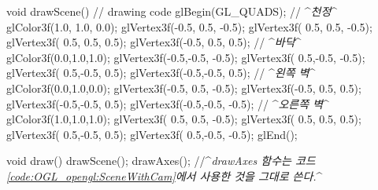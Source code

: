 void drawScene() {
  // drawing code
  glBegin(GL_QUADS);
  // ^{\it 천정}^
  glColor3f(1.0, 1.0, 0.0);
  glVertex3f(-0.5, 0.5, -0.5);
  glVertex3f( 0.5, 0.5, -0.5);
  glVertex3f( 0.5, 0.5,  0.5);
  glVertex3f(-0.5, 0.5,  0.5);
  // ^{\it 바닥}^
  glColor3f(0.0,1.0,1.0);
  glVertex3f(-0.5,-0.5, -0.5);
  glVertex3f( 0.5,-0.5, -0.5);
  glVertex3f( 0.5,-0.5,  0.5);
  glVertex3f(-0.5,-0.5,  0.5);
  // ^{\it 왼쪽 벽}^
  glColor3f(0.0,1.0,0.0);
  glVertex3f(-0.5, 0.5, -0.5);
  glVertex3f(-0.5, 0.5,  0.5);
  glVertex3f(-0.5,-0.5,  0.5);
  glVertex3f(-0.5,-0.5, -0.5);
  // ^{\it 오른쪽 벽}^
  glColor3f(1.0,1.0,1.0);
  glVertex3f( 0.5, 0.5, -0.5);
  glVertex3f( 0.5, 0.5,  0.5);
  glVertex3f( 0.5,-0.5,  0.5);
  glVertex3f( 0.5,-0.5, -0.5);
  glEnd();
}

void draw() {
  drawScene();
  drawAxes(); //^{\it drawAxes 함수는 코드 \ref{code:OGL_opengl:SceneWithCam}에서 사용한 것을 그대로 쓴다.}^
}
